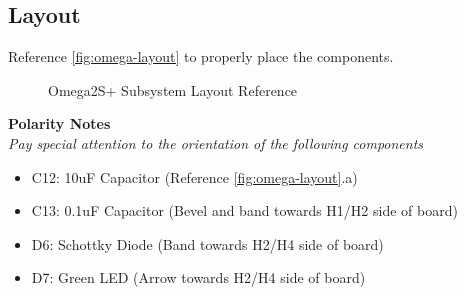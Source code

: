 \documentclass{article}
\begin{document}
\subsection{Layout}

Reference \autoref{fig:omega-layout} to properly place the components.

\begin{figure}[H]
    \centering
        \qquad
        \caption{Omega2S+ Subsystem Layout Reference}%
    \label{fig:omega-layout}%
\end{figure}

\noindent \textbf{Polarity Notes}\\
\noindent \textit{Pay special attention to the orientation of the following components}
\begin{itemize}
  \item C12: 10uF Capacitor (Reference \autoref{fig:omega-layout}.a)
  \item C13: 0.1uF Capacitor (Bevel and band towards H1/H2 side of board)
  \item D6: Schottky Diode (Band towards H2/H4 side of board) 
  \item D7: Green LED (Arrow towards H2/H4 side of board)
\end{itemize}
\end{document}
